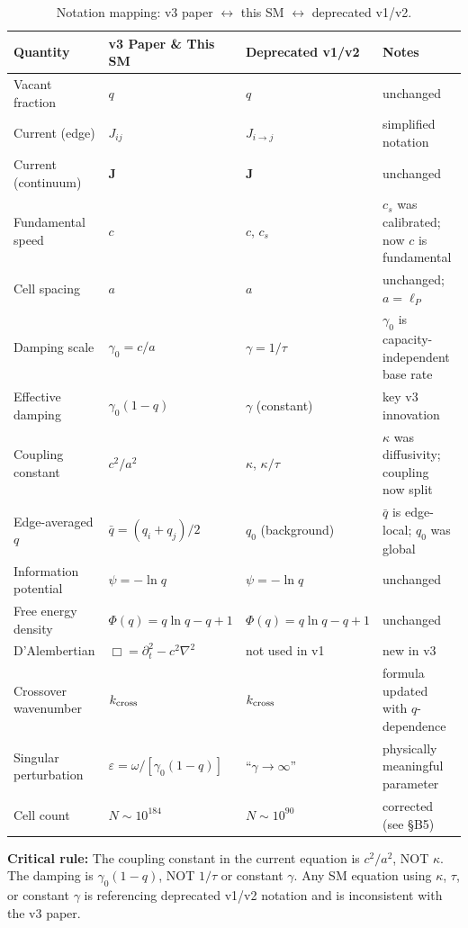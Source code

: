 \documentclass[reprint]{revtex4-2}
\begin{document}
\begin{table}[h]
\caption{Notation mapping: v3 paper $\leftrightarrow$ this SM $\leftrightarrow$ deprecated v1/v2.}
\label{tab:notation}
\begin{tabular}{llll}
\toprule
Quantity & v3 Paper \& This SM & Deprecated v1/v2 & Notes \\
\midrule
Vacant fraction & $q$ & $q$ & unchanged \\
Current (edge) & $J_{ij}$ & $J_{i\to j}$ & simplified notation \\
Current (continuum) & $\mathbf{J}$ & $\mathbf{J}$ & unchanged \\
Fundamental speed & $c$ & $c$, $c_s$ & $c_s$ was calibrated; now $c$ is fundamental \\
Cell spacing & $a$ & $a$ & unchanged; $a=\ell_P$ \\
Damping scale & $\gamma_0 = c/a$ & $\gamma = 1/\tau$ & $\gamma_0$ is capacity-independent base rate \\
Effective damping & $\gamma_0(1-q)$ & $\gamma$ (constant) & key v3 innovation \\
Coupling constant & $c^2/a^2$ & $\kappa$, $\kappa/\tau$ & $\kappa$ was diffusivity; coupling now split \\
Edge-averaged $q$ & $\bar{q} = (q_i+q_j)/2$ & $q_0$ (background) & $\bar{q}$ is edge-local; $q_0$ was global \\
Information potential & $\psi = -\ln q$ & $\psi = -\ln q$ & unchanged \\
Free energy density & $\Phi(q)=q\ln q - q + 1$ & $\Phi(q)=q\ln q - q + 1$ & unchanged \\
D'Alembertian & $\Box = \partial_t^2 - c^2\nabla^2$ & not used in v1 & new in v3 \\
Crossover wavenumber & $k_{\rm cross}$ & $k_{\rm cross}$ & formula updated with $q$-dependence \\
Singular perturbation & $\varepsilon = \omega/[\gamma_0(1-q)]$ & ``$\gamma\to\infty$'' & physically meaningful parameter \\
Cell count & $N \sim 10^{184}$ & $N \sim 10^{90}$ & corrected (see \S B5) \\
\bottomrule
\end{tabular}
\end{table}

\textbf{Critical rule:} The coupling constant in the current equation is $c^2/a^2$, NOT $\kappa$. The damping is $\gamma_0(1-q)$, NOT $1/\tau$ or constant $\gamma$. Any SM equation using $\kappa$, $\tau$, or constant $\gamma$ is referencing deprecated v1/v2 notation and is inconsistent with the v3 paper.
\end{document}
